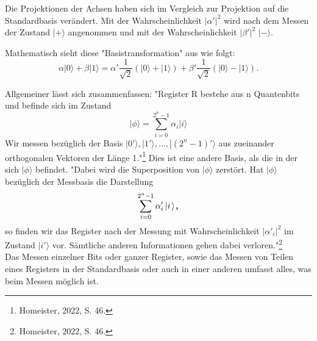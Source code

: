Die Projektionen der Achsen haben sich im Vergleich zur Projektion auf die Standardbasis verändert. Mit der Wahrscheinlichkeit $\left|\alpha'\right|^2$ wird nach dem Messen der Zustand $\left|+\right.\rangle$ angenommen und mit der Wahrscheinlichkeit $\left|\beta'\right|^2$ $\left|-\right.\rangle$. 

Mathematisch sieht diese "Basistransformation" aus wie folgt:
$$\alpha\left|0\right.\rangle+\beta\left|1\right.\rangle=\alpha'\frac{1}{\sqrt{2}}\left(\left|0\right.\rangle+\left|1\right.\rangle\right)+\beta'\frac{1}{\sqrt{2}}\left(\left|0\right.\rangle-\left|1\right.\rangle\right).$$


Allgemeiner lässt sich zusammenfassen: "Register R bestehe aus n Quantenbits und befinde sich im Zustand
$$\left|\phi\right.\rangle=\sum_{i=0}^{2^n-1}\alpha_i\left|i\right.\rangle$$
Wir messen bezüglich der Basis
$\left|0'\right.\rangle,\left|1'\right.\rangle,...,\left|(2^n-1)'\right.\rangle$
aus zueinander orthogonalen Vektoren der Länge 1."\footnote{Homeister, 2022, S. 46.} Dies ist eine andere Basis, als die in der sich $\left|\phi\right.\rangle$ befindet. "Dabei wird die Superposition von $\left|\phi\right.\rangle$ zerstört. Hat $\left|\phi\right.\rangle$ bezüglich der Messbasis die Darstellung
$$\sum_{i=0}^{2^n-1}\alpha'_i\left|i\right.\rangle\verb|,|$$
so finden wir das Register nach der Messung mit Wahrscheinlichkeit $\left|\alpha'_i\right|^2$ im Zustand $\left|i'\right.\rangle$ vor.  Sämtliche anderen Informationen gehen dabei
verloren."\footnote{Homeister, 2022, S. 46.}\\

Das Messen einzelner Bits oder ganzer Register, sowie das Messen von Teilen eines Registers in der Standardbasis oder auch in einer anderen umfasst alles, was beim Messen möglich ist.

